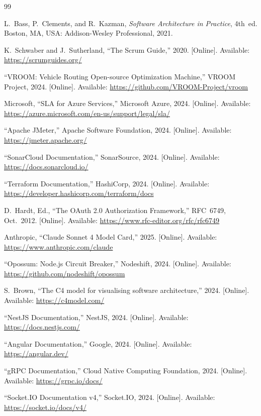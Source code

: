 \documentclass[conference]{IEEEtran}
\begin{document}

\begin{thebibliography}{99}

L.~Bass, P.~Clements, and R.~Kazman, \emph{Software Architecture in Practice}, 4th~ed. Boston, MA, USA: Addison-Wesley Professional, 2021.

K.~Schwaber and J.~Sutherland, ``The Scrum Guide,'' 2020. [Online]. Available: \url{https://scrumguides.org/}

``VROOM: Vehicle Routing Open-source Optimization Machine,'' VROOM Project, 2024. [Online]. Available: \url{https://github.com/VROOM-Project/vroom}

Microsoft, ``SLA for Azure Services,'' Microsoft Azure, 2024. [Online]. Available: \url{https://azure.microsoft.com/en-us/support/legal/sla/}

``Apache JMeter,'' Apache Software Foundation, 2024. [Online]. Available: \url{https://jmeter.apache.org/}

``SonarCloud Documentation,'' SonarSource, 2024. [Online]. Available: \url{https://docs.sonarcloud.io/}

``Terraform Documentation,'' HashiCorp, 2024. [Online]. Available: \url{https://developer.hashicorp.com/terraform/docs}

D.~Hardt, Ed., ``The OAuth 2.0 Authorization Framework,'' RFC~6749, Oct.~2012. [Online]. Available: \url{https://www.rfc-editor.org/rfc/rfc6749}

Anthropic, ``Claude Sonnet 4 Model Card,'' 2025. [Online]. Available: \url{https://www.anthropic.com/claude}

``Opossum: Node.js Circuit Breaker,'' Nodeshift, 2024. [Online]. Available: \url{https://github.com/nodeshift/opossum}

S.~Brown, ``The C4 model for visualising software architecture,'' 2024. [Online]. Available: \url{https://c4model.com/}

``NestJS Documentation,'' NestJS, 2024. [Online]. Available: \url{https://docs.nestjs.com/}

``Angular Documentation,'' Google, 2024. [Online]. Available: \url{https://angular.dev/}

``gRPC Documentation,'' Cloud Native Computing Foundation, 2024. [Online]. Available: \url{https://grpc.io/docs/}

``Socket.IO Documentation v4,'' Socket.IO, 2024. [Online]. Available: \url{https://socket.io/docs/v4/}

\end{thebibliography}
\end{document}
